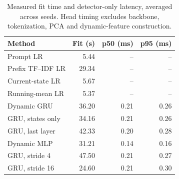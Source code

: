 \begin{table}[t]
\centering\footnotesize
\caption{Measured fit time and detector-only latency, averaged across seeds. Head timing excludes backbone, tokenization, PCA and dynamic-feature construction.}\label{tab:timing}
\begin{tabular}{lrrr}\toprule
Method & Fit (s) & p50 (ms) & p95 (ms) \\
\midrule
Prompt LR & 5.44 & -- & -- \\
Prefix TF--IDF LR & 29.34 & -- & -- \\
Current-state LR & 5.67 & -- & -- \\
Running-mean LR & 5.37 & -- & -- \\
Dynamic GRU & 36.20 & 0.21 & 0.26 \\
GRU, states only & 34.16 & 0.21 & 0.26 \\
GRU, last layer & 42.33 & 0.20 & 0.28 \\
Dynamic MLP & 31.21 & 0.14 & 0.16 \\
GRU, stride 4 & 47.50 & 0.21 & 0.27 \\
GRU, stride 16 & 24.60 & 0.21 & 0.30 \\
\bottomrule\end{tabular}
\end{table}
